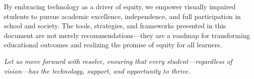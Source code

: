 By embracing technology as a driver of equity, we empower visually impaired students to pursue academic excellence, independence, and full participation in school and society. The tools, strategies, and frameworks presented in this document are not merely recommendations—they are a roadmap for transforming educational outcomes and realizing the promise of equity for all learners.

\bigskip

\noindent\textit{Let us move forward with resolve, ensuring that every student—regardless of vision—has the technology, support, and opportunity to thrive.}

